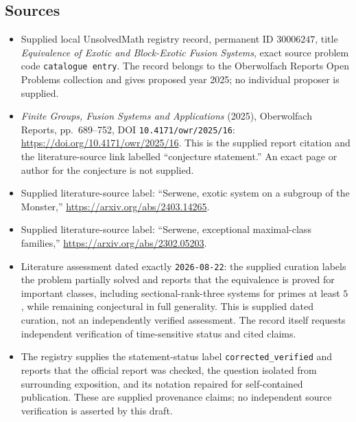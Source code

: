 \documentclass[11pt]{article}
\begin{document}
\subsection{Sources}
\begin{itemize}
\item Supplied local UnsolvedMath registry record, permanent ID \(30006247\), title \emph{Equivalence of Exotic and Block-Exotic Fusion Systems}, exact source problem code \texttt{catalogue entry}. The record belongs to the Oberwolfach Reports Open Problems collection and gives proposed year 2025; no individual proposer is supplied.
\item \emph{Finite Groups, Fusion Systems and Applications} (2025), Oberwolfach Reports, pp.~689--752, DOI \texttt{10.4171/owr/2025/16}: \url{https://doi.org/10.4171/owr/2025/16}. This is the supplied report citation and the literature-source link labelled ``conjecture statement.'' An exact page or author for the conjecture is not supplied.
\item Supplied literature-source label: ``Serwene, exotic system on a subgroup of the Monster,'' \url{https://arxiv.org/abs/2403.14265}.
\item Supplied literature-source label: ``Serwene, exceptional maximal-class families,'' \url{https://arxiv.org/abs/2302.05203}.
\item Literature assessment dated exactly \texttt{2026-08-22}: the supplied curation labels the problem partially solved and reports that the equivalence is proved for important classes, including sectional-rank-three systems for primes at least \(5\), while remaining conjectural in full generality. This is supplied dated curation, not an independently verified assessment. The record itself requests independent verification of time-sensitive status and cited claims.
\item The registry supplies the statement-status label \texttt{corrected\_verified} and reports that the official report was checked, the question isolated from surrounding exposition, and its notation repaired for self-contained publication. These are supplied provenance claims; no independent source verification is asserted by this draft.
\end{itemize}
\end{document}

